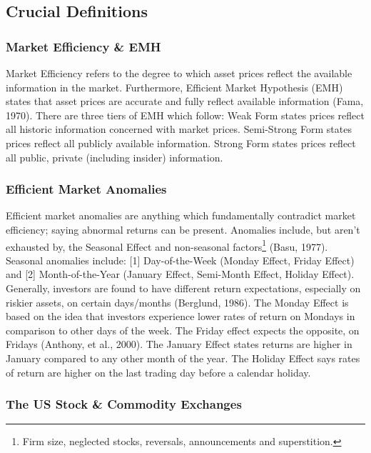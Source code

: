 \documentclass[11pt, english]{article}
\begin{document}
	\subsection{Crucial Definitions}

		\subsubsection{Market Efficiency \& EMH}

		Market Efficiency refers to the degree to which asset prices reflect the available information in the market. Furthermore, Efficient Market Hypothesis (EMH) states that asset prices are accurate and fully reflect available information (Fama, 1970). There are three tiers of EMH which follow: Weak Form states prices reflect all historic information concerned with market prices. Semi-Strong Form states prices reflect all publicly available information. Strong Form states prices reflect all public, private (including insider) information.

		\subsubsection{Efficient Market Anomalies}

		Efficient market anomalies are anything which fundamentally contradict market efficiency; saying abnormal returns can be present. Anomalies include, but aren’t exhausted by, the Seasonal Effect and non-seasonal factors\footnote{Firm size, neglected stocks, reversals, announcements and superstition.} (Basu, 1977). Seasonal anomalies include: [1] Day-of-the-Week (Monday Effect, Friday Effect) and [2] Month-of-the-Year (January Effect, Semi-Month Effect, Holiday Effect). Generally, investors are found to have different return expectations, especially on riskier assets, on certain days/months (Berglund, 1986). The Monday Effect is based on the idea that investors experience lower rates of return on Mondays in comparison to other days of the week. The Friday effect expects the opposite, on Fridays (Anthony, et al., 2000). The January Effect states returns are higher in January compared to any other month of the year. The Holiday Effect says rates of return are higher on the last trading day before a calendar holiday.

		\subsubsection{The US Stock \& Commodity Exchanges}
\end{document}
